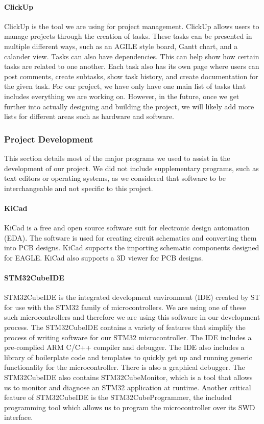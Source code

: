 \paragraph{ClickUp}
ClickUp is the tool we are using for project management. ClickUp allows users to manage projects through the creation of tasks. These tasks can be presented in multiple different ways, such as an AGILE style board, Gantt chart, and a calander view. Tasks can also have dependencies. This can help show how certain tasks are related to one another. Each task also has its own page where users can post comments, create subtasks, show task history, and create documentation for the given task. For our project, we have only have one main list of tasks that includes everything we are working on. However, in the future, once we get further into actually designing and building the project, we will likely add more lists for different areas such as hardware and software.

\subsubsection{Project Development}
This section details most of the major programs we used to assist in the development of our project. We did not include supplementary programs, such as text editors or operating systems, as we considered that software to be interchangeable and not specific to this project.

\paragraph{KiCad}
KiCad is a free and open source software suit for electronic design automation (EDA). The software is used for creating circuit schematics and converting them into PCB designs. KiCad supports the importing schematic components designed for EAGLE. KiCad also supports a 3D viewer for PCB designs. 

\paragraph{STM32CubeIDE}
STM32CubeIDE is the integrated development environment (IDE) created by ST for use with the STM32 family of microcontrollers. We are using one of these such microcontrollers and therefore we are using this software in our development process. The STM32CubeIDE contains a variety of features that simplify the process of writing software for our STM32 microcontroller. The IDE includes a pre-complied ARM C/C++ compiler and debugger. The IDE also includes a library of boilerplate code and templates to quickly get up and running generic functionality for the microcontroller. There is also a graphical debugger. The STM32CubeIDE also contains STM32CubeMonitor, which is a tool that allows us to monitor and diagnose an STM32 application at runtime. Another critical feature of STM32CubeIDE is the STM32CubeProgrammer, the included programming tool which allows us to program the microcontroller over its SWD interface.

